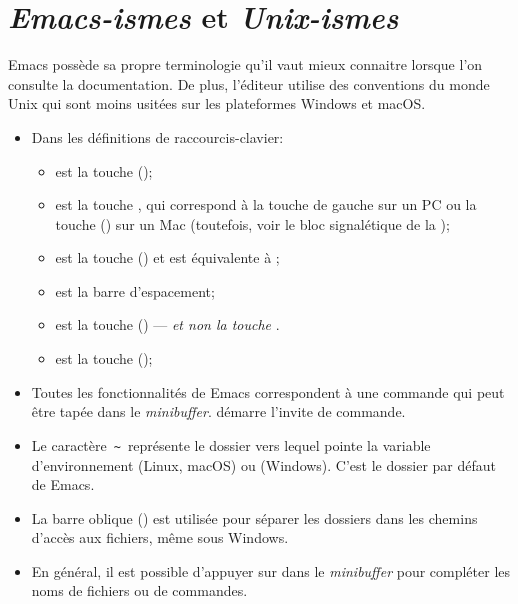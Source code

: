 \section{\emph{Emacs-ismes} et \emph{Unix-ismes}}
\label{sec:emacs+ess:ismes}

Emacs possède sa propre terminologie qu'il vaut mieux connaitre
lorsque l'on consulte la documentation. De plus, l'éditeur utilise des
conventions du monde Unix qui sont moins usitées sur les plateformes
Windows et macOS.

\begin{itemize}
\item Dans les définitions de raccourcis-clavier:
  \begin{itemize}
  \item {} est la touche  (\ctlkey);
  \item {} est la touche , qui correspond à la touche
     de gauche sur un PC ou la touche 
    (\optkey) sur un Mac (toutefois, voir le bloc signalétique de la
    );
  \item {} est la touche  (\esckey) et
    est équivalente à ;
  \item {} est la barre d'espacement;
  \item {} est la touche  (\delkey) ---
    \emph{et non la touche} .
  \item {} est la touche  (\returnkey);
  \end{itemize}
\item Toutes les fonctionnalités de Emacs correspondent à une commande
  qui peut être tapée dans le \emph{minibuffer}.  démarre
  l'invite de commande.
\item Le caractère \,\verb=~=\, représente le dossier vers lequel
  pointe la variable d'environnement  (Linux, macOS) ou
   (Windows). C'est le dossier par défaut de Emacs.
\item La barre oblique (\code{/}) est utilisée pour séparer les
  dossiers dans les chemins d'accès aux fichiers, même sous Windows.
\item En général, il est possible d'appuyer sur  dans le
  \emph{minibuffer} pour compléter les noms de fichiers ou de
  commandes.
\end{itemize}

